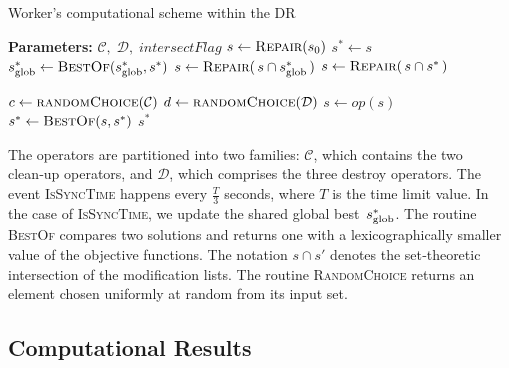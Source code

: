 \documentclass{article}
\begin{document}
\begin{algorithm}[H]
  \caption{Worker's computational scheme within the DR}
  \label{alg:msdr}
  \begin{algorithmic}[1]
      \State \textbf{Parameters:} $\mathcal C,\;\mathcal D,\;\textit{intersectFlag}$
      \State $s \gets \Call{Repair}{s_0}$ 
      \State $ s^* \gets s$ 
          \State $s_{\rm glob}^* \gets \Call{BestOf}{s_{\rm glob}^*, s^*}$
            \State $s \gets \Call{Repair}{\,s \cap s_{\rm glob}^*\,}$
           \Else
            \State $s \gets \Call{Repair}{\,s \cap s^*\,}$
          \EndIf
        \EndIf

        \State $c \gets \Call{randomChoice}{\mathcal C}$   
        \State $d \gets \Call{randomChoice}{\mathcal D}$   
          \State $s \gets op(s)$
          \State $s^* \gets \Call{BestOf}{s, s^*}$
        \EndFor
      \EndWhile
      \State \Return $s^*$
    \EndFunction
  \end{algorithmic}
\end{algorithm}

The operators are partitioned into two families: $\mathcal{C}$, which contains the two clean‑up operators, and $\mathcal{D}$, which comprises the three destroy operators. 
The event \textsc{IsSyncTime} happens every $\frac{T}{3}$ seconds, where $T$ is the time limit value. 
In the case of \textsc{IsSyncTime}, we update the shared global best~$s_{\rm glob}^*$. 
The routine \textsc{BestOf} compares two solutions and returns one with a lexicographically smaller value of the objective functions. 
The notation $s \cap s'$ denotes the set‑theoretic intersection of the modification lists. 
The routine \textsc{RandomChoice} returns an element chosen uniformly at random from its input set.




\subsection{Computational Results}
\label{sec:experiments}
\end{document}
